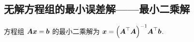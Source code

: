 \subsection{无解方程组的最小误差解——最小二乘解}

\begin{theorem}[最小二乘解]
    方程组 $\vb*{Ax}=\vb*{b}$ 的最小二乘解为 $\vb*{x}=\qty(\vb*{A}^\top\vb*{A})^{-1}\vb*{A}^\top\vb*{b}$.
\end{theorem}